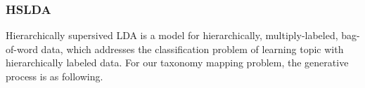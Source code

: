 
\subsubsection{HSLDA}

Hierarchically supersived LDA \cite{perotte2011hierarchically} is a model for 
hierarchically, multiply-labeled, bag-of-word data, which addresses the classification 
problem of learning topic with hierarchically labeled data. For our taxonomy mapping 
problem, the generative process is as following.





